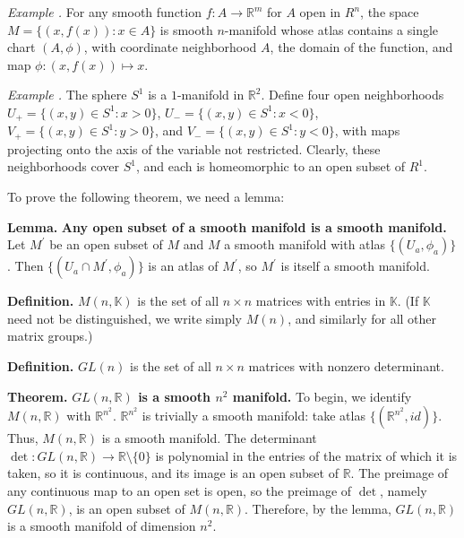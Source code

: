 \documentclass[12pt]{article}
\newcommand{\R}{\mathbb{R}}
\newcommand{\K}{\mathbb{K}}
\newenvironment{example}{\textit{Example \theexample.}}{}
\newcounter{example}
\newenvironment{definition}{\textbf{Definition.}}{\vspace{6pt}}
\newenvironment{theorem}{\textbf{Theorem.}}{\vspace{6pt}}
\newenvironment{lemma}{\textbf{Lemma.}}{\vspace{6pt}}
\begin{document}
\begin{example}
    For any smooth function $f: A \to \R^m$ for
    $A$ open in $R^n$, the space $M = \{(x,f(x)):x
    \in A\}$ is smooth $n$-manifold whose atlas
    contains a single chart $(A, \phi)$, with
    coordinate neighborhood $A$, the domain of the
    function, and map $\phi: (x,f(x)) \mapsto x$.
\end{example}

\begin{example}
    The sphere $S^1$ is a $1$-manifold in $\R^2$.
    Define four open neighborhoods $U_+ = \{(x,y)
    \in S^1 : x > 0\}$, $U_{-} = \{(x,y)
    \in S^1 : x < 0\}$, $V_+ = \{(x,y)
    \in S^1 : y > 0\}$, and $V_{-} = \{(x,y)
    \in S^1 : y < 0\}$, with maps
    projecting onto the axis of the variable not
    restricted. Clearly, these neighborhoods
    cover $S^1$, and each is homeomorphic to an
    open subset of $R^1$.
\end{example}

To prove the following theorem, we need a lemma: 

\begin{lemma}
    \textbf{Any open subset of a smooth manifold is a smooth manifold.}
    Let $M^\prime$ be an open subset of $M$ and
    $M$ a smooth manifold with atlas $\{(U_a,
    \phi_a)\}$. Then $\{(U_a \cap M^\prime, \phi_a)\}$ is
    an atlas of $M^\prime$, so $M^\prime$ is
    itself a smooth manifold.
\end{lemma}

\begin{definition}
    $M(n,\K)$ is the set of all $n \times
    n$ matrices with entries in $\K$. (If $\K$ need not
    be distinguished, we write simply $M(n)$, and
    similarly for all other matrix groups.)
\end{definition}

\begin{definition}
    \textbf{$GL(n)$} is the set of all
    $n \times n$ matrices with nonzero determinant. 
\end{definition}

\begin{theorem}
    \textbf{$GL(n, \R)$ is a smooth $n^2$
    manifold.} To begin, we identify $M(n, \R)$
    with $\R^{n^2}$. $\R^{n^2}$ is trivially a
    smooth manifold: take atlas $\{(\R^{n^2},
    id)\}$. Thus, $M(n, \R)$ is a smooth manifold.
    The determinant $\det: GL(n, \R) \to \R
    \setminus \{0\}$ is polynomial in the entries
    of the matrix of which it is taken, so it is
    continuous, and its image is an
    open subset of $\R$. The preimage of any
    continuous map to an open set is open, so the
    preimage of $\det$, namely $GL(n, \R)$, is an
    open subset of $M(n, \R)$. Therefore, by the
    lemma, $GL(n, \R)$ is a smooth manifold of
    dimension $n^2$.
\end{theorem}
\end{document}
